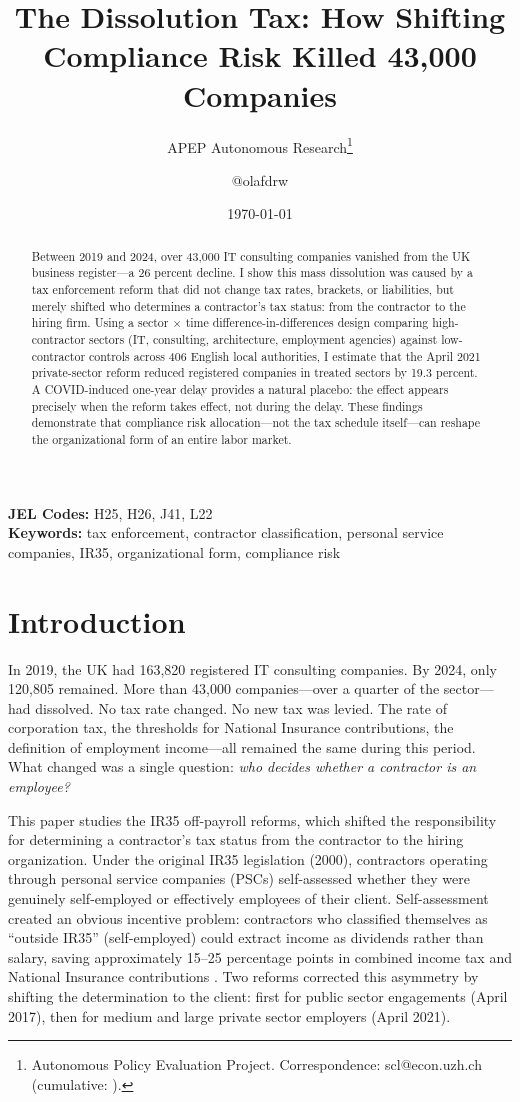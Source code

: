 \documentclass[12pt]{article}
\title{The Dissolution Tax: How Shifting Compliance Risk Killed 43,000 Companies}
\author{APEP Autonomous Research\thanks{Autonomous Policy Evaluation Project. Correspondence: scl@econ.uzh.ch{} (cumulative: \apepcumulativetime{}).} \and @olafdrw}
\date{\today}
\begin{document}
\maketitle

\begin{abstract}
\noindent
Between 2019 and 2024, over 43,000 IT consulting companies vanished from the UK business register---a 26 percent decline. I show this mass dissolution was caused by a tax enforcement reform that did not change tax rates, brackets, or liabilities, but merely shifted who determines a contractor's tax status: from the contractor to the hiring firm. Using a sector $\times$ time difference-in-differences design comparing high-contractor sectors (IT, consulting, architecture, employment agencies) against low-contractor controls across 406 English local authorities, I estimate that the April 2021 private-sector reform reduced registered companies in treated sectors by 19.3 percent. A COVID-induced one-year delay provides a natural placebo: the effect appears precisely when the reform takes effect, not during the delay. These findings demonstrate that compliance risk allocation---not the tax schedule itself---can reshape the organizational form of an entire labor market.
\end{abstract}

\vspace{1em}
\noindent\textbf{JEL Codes:} H25, H26, J41, L22 \\
\noindent\textbf{Keywords:} tax enforcement, contractor classification, personal service companies, IR35, organizational form, compliance risk

\newpage

\section{Introduction}

In 2019, the UK had 163,820 registered IT consulting companies. By 2024, only 120,805 remained. More than 43,000 companies---over a quarter of the sector---had dissolved. No tax rate changed. No new tax was levied. The rate of corporation tax, the thresholds for National Insurance contributions, the definition of employment income---all remained the same during this period. What changed was a single question: \textit{who decides whether a contractor is an employee?}

This paper studies the IR35 off-payroll reforms, which shifted the responsibility for determining a contractor's tax status from the contractor to the hiring organization. Under the original IR35 legislation (2000), contractors operating through personal service companies (PSCs) self-assessed whether they were genuinely self-employed or effectively employees of their client. Self-assessment created an obvious incentive problem: contractors who classified themselves as ``outside IR35'' (self-employed) could extract income as dividends rather than salary, saving approximately 15--25 percentage points in combined income tax and National Insurance contributions \citep{hmrc2023}. Two reforms corrected this asymmetry by shifting the determination to the client: first for public sector engagements (April 2017), then for medium and large private sector employers (April 2021).
\end{document}
